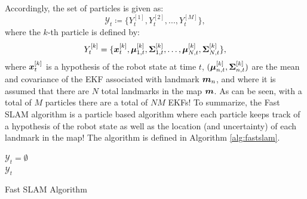 Accordingly, the set of particles is given as:
\begin{equation*}
\mathcal{Y}_t \coloneqq \{Y_t^{[1]}, Y_t^{[2]},..., Y_t^{[M]}\},
\end{equation*}
where the $k$-th particle is defined by:
\begin{equation*}
Y_t^{[k]} = \{\bm{x}_t^{[k]}, \bm{\mu}_{1,t}^{[k]}, \bm{\Sigma}_{1,t}^{[k]}, \dots, \bm{\mu}_{N,t}^{[k]}, \bm{\Sigma}_{N,t}^{[k]} \},
\end{equation*}
where $\bm{x}_t^{[k]}$ is a hypothesis of the robot state at time $t$, $(\bm{\mu}_{n,t}^{[k]}, \bm{\Sigma}_{n,t}^{[k]})$ are the mean and covariance of the EKF associated with landmark $\bm{m}_n$, and where it is assumed that there are $N$ total landmarks in the map $\bm{m}$. As can be seen, with a total of $M$ particles there are a total of $NM$ EKFs!
To summarize, the Fast SLAM algorithm is a particle based algorithm where each particle keeps track of a hypothesis of the robot state as well as the location (and uncertainty) of each landmark in the map! The algorithm is defined in Algorithm \ref{alg:fastslam}.
\begin{algorithm}[ht]
 $\mathcal{Y}_t = \emptyset$\\
 \Return $\mathcal{Y}_t$
 \caption{Fast SLAM Algorithm}
 \label{alg:fastslam}
\end{algorithm}

